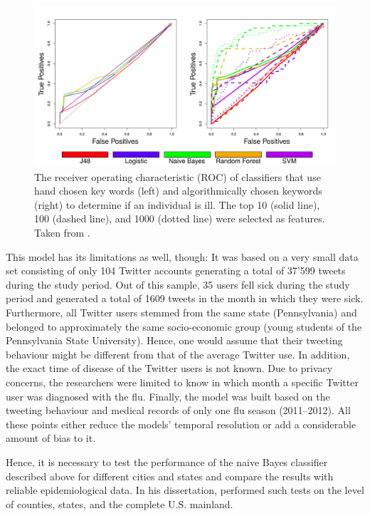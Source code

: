 \documentclass[11pt, a4paper,twoside]{report}\usepackage[]{graphicx}\usepackage[]{color}
\begin{document}
\begin{figure}[htbp!]
  \centering
    \includegraphics[width=.9\textwidth]{01_ROC_classification_seed.png}
  \caption{The receiver operating characteristic (ROC) of classifiers that use hand chosen key words (left) and algorithmically chosen keywords (right) to determine if an individual is ill. The top 10 (solid line), 100 (dashed line), and 1000 (dotted line) were selected as features. Taken from \cite{bodnar_ground_2014}.}
  \label{fig:ROC_classification_seed}
  \end{figure}

This model has its limitations as well, though: It was based on a very small data set consisting of only 104 Twitter accounts generating a total of 37’599 tweets during the study period. Out of this sample, 35 users fell sick during the study period and generated a total of 1609 tweets in the month in which they were sick. Furthermore, all Twitter users stemmed from the same state (Pennsylvania) and belonged to approximately the same socio-economic group (young students of the Pennsylvania State University). Hence, one would assume that their tweeting behaviour might be different from that of the average Twitter use. In addition, the exact time of disease of the Twitter users is not known. Due to privacy concerns, the researchers were limited to know in which month a specific Twitter user was diagnosed with the flu. Finally, the model was built based on the tweeting behaviour and medical records of only one flu season (2011--2012). All these points either reduce the models' temporal resolution or add a considerable amount of bias to it.

Hence, it is necessary to test the performance of the naive Bayes classifier described above for different cities and states and compare the results with reliable epidemiological data. In his dissertation, \cite{bodnar_data_2015} performed such tests on the level of counties, states, and the complete U.S. mainland.
\end{document}

